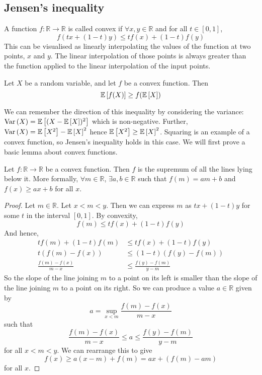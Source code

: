 \subsection{Jensen's inequality}
\begin{definition}
	A function \(f\colon \mathbb R \to \mathbb R\) is called convex if \(\forall x, y \in \mathbb R\) and for all \(t \in [0, 1]\),
	\[
		f(tx + (1-t)y) \leq tf(x) + (1-t)f(y)
	\]
	This can be visualised as linearly interpolating the values of the function at two points, \(x\) and \(y\).
	The linear interpolation of those points is always greater than the function applied to the linear interpolation of the input points.
\end{definition}
\begin{theorem}
	Let \(X\) be a random variable, and let \(f\) be a convex function.
	Then
	\[
		\mathbb{E}\left[{f(X)}\right] \geq f(\mathbb{E}\left[{X}\right])
	\]
\end{theorem}
\noindent We can remember the direction of this inequality by considering the variance: \(\operatorname{Var}\left({X}\right) = \mathbb{E}\left[{(X - \mathbb{E}\left[{X}\right])^2}\right]\) which is non-negative.
Further, \(\operatorname{Var}\left({X}\right) = \mathbb{E}\left[{X^2}\right] - \mathbb{E}\left[{X}\right]^2\) hence \(\mathbb{E}\left[{X^2}\right] \geq \mathbb{E}\left[{X}\right]^2\).
Squaring is an example of a convex function, so Jensen's inequality holds in this case.
We will first prove a basic lemma about convex functions.
\begin{lemma}
	Let \(f \colon \mathbb R \to \mathbb R\) be a convex function.
	Then \(f\) is the supremum of all the lines lying below it.
	More formally, \(\forall m \in \mathbb R\), \(\exists a, b \in \mathbb R\) such that \(f(m) = am + b\) and \(f(x) \geq ax + b\) for all \(x\).
\end{lemma}
\begin{proof}
	Let \(m \in \mathbb R\).
	Let \(x < m < y\).
	Then we can express \(m\) as \(tx + (1-t)y\) for some \(t\) in the interval \([0, 1]\).
	By convexity,
	\[
		f(m) \leq tf(x) + (1-t)f(y)
	\]
	And hence,
	\begin{align*}
		tf(m) + (1-t)f(m)         & \leq tf(x) + (1-t)f(y)       \\
		t(f(m) - f(x))            & \leq (1-t)(f(y) - f(m))      \\
		\frac{f(m) - f(x)}{m - x} & \leq \frac{f(y) - f(m)}{y-m}
	\end{align*}
	So the slope of the line joining \(m\) to a point on its left is smaller than the slope of the line joining \(m\) to a point on its right.
	So we can produce a value \(a \in \mathbb R\) given by
	\[
		a = \sup_{x < m} \frac{f(m) - f(x)}{m - x}
	\]
	such that
	\[
		\frac{f(m) - f(x)}{m - x} \leq a \leq \frac{f(y) - f(m)}{y - m}
	\]
	for all \(x < m < y\).
	We can rearrange this to give
	\[
		f(x) \geq a(x-m) + f(m) = ax + (f(m) - am)
	\]
	for all \(x\).
\end{proof}
